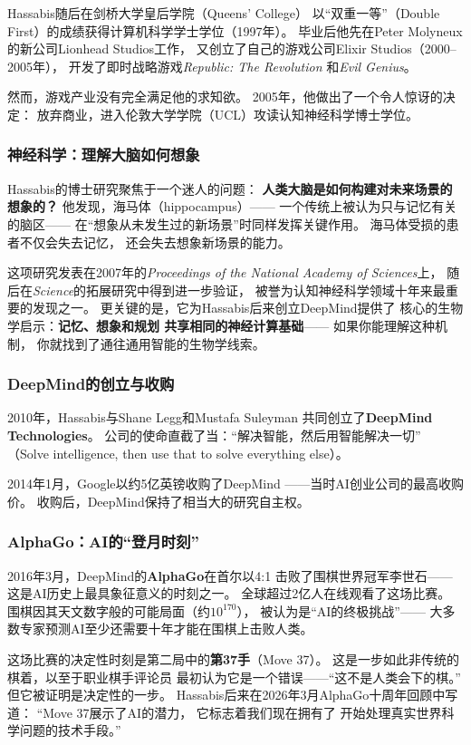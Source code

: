 Hassabis随后在剑桥大学皇后学院（Queens' College）
以``双重一等''（Double First）的成绩获得计算机科学学士学位（1997年）。
毕业后他先在Peter Molyneux的新公司Lionhead Studios工作，
又创立了自己的游戏公司Elixir Studios（2000--2005年），
开发了即时战略游戏\textit{Republic: The Revolution}
和\textit{Evil Genius}。

然而，游戏产业没有完全满足他的求知欲。
2005年，他做出了一个令人惊讶的决定：
放弃商业，进入伦敦大学学院（UCL）攻读认知神经科学博士学位。

\subsubsection{神经科学：理解大脑如何想象}
Hassabis的博士研究聚焦于一个迷人的问题：
\textbf{人类大脑是如何构建对未来场景的想象的？}
他发现，海马体（hippocampus）——
一个传统上被认为只与记忆有关的脑区——
在``想象从未发生过的新场景''时同样发挥关键作用。
海马体受损的患者不仅会失去记忆，
还会失去想象新场景的能力。

这项研究发表在2007年的\textit{Proceedings of the
National Academy of Sciences}上，
随后在\textit{Science}的拓展研究中得到进一步验证，
被誉为认知神经科学领域十年来最重要的发现之一。
更关键的是，它为Hassabis后来创立DeepMind提供了
核心的生物学启示：\textbf{记忆、想象和规划
共享相同的神经计算基础}——
如果你能理解这种机制，
你就找到了通往通用智能的生物学线索。

\subsubsection{DeepMind的创立与收购}
2010年，Hassabis与Shane Legg和Mustafa Suleyman
共同创立了\textbf{DeepMind Technologies}。
公司的使命直截了当：``解决智能，然后用智能解决一切''
（Solve intelligence, then use that to solve everything else）。

2014年1月，Google以约5亿英镑收购了DeepMind
——当时AI创业公司的最高收购价。
收购后，DeepMind保持了相当大的研究自主权。

\subsubsection{AlphaGo：AI的``登月时刻''}
2016年3月，DeepMind的\textbf{AlphaGo}在首尔以4:1
击败了围棋世界冠军李世石——
这是AI历史上最具象征意义的时刻之一。
全球超过2亿人在线观看了这场比赛。
围棋因其天文数字般的可能局面（约$10^{170}$），
被认为是``AI的终极挑战''——
大多数专家预测AI至少还需要十年才能在围棋上击败人类。

这场比赛的决定性时刻是第二局中的\textbf{第37手}（Move 37）。
这是一步如此非传统的棋着，以至于职业棋手评论员
最初认为它是一个错误——``这不是人类会下的棋。''
但它被证明是决定性的一步。
Hassabis后来在2026年3月AlphaGo十周年回顾中写道：
``Move 37展示了AI的潜力，
它标志着我们现在拥有了
开始处理真实世界科学问题的技术手段。''


